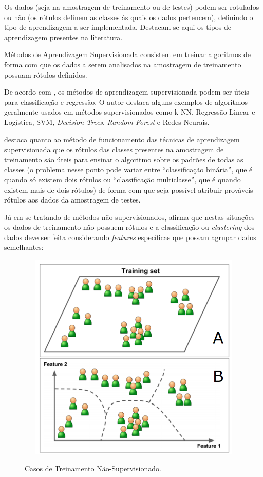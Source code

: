 Os dados (seja na amostragem de treinamento ou de testes) podem ser rotulados ou não (os rótulos definem as classes às quais os dados pertencem), definindo o tipo de aprendizagem a ser implementada. Destacam-se aqui os tipos de aprendizagem presentes na literatura.






Métodos de Aprendizagem Supervisionada consistem em treinar algoritmos de forma com que os dados a serem analisados na amostragem de treinamento possuam rótulos definidos. 

De acordo com , os métodos de aprendizagem supervisionada podem ser úteis para classificação e regressão. O autor destaca alguns exemplos de algoritmos geralmente usados em métodos supervisionados como k-NN, Regressão Linear e Logística, SVM, \textit{Decision Trees},  \textit{Random Forest} e Redes Neurais.

 destaca quanto ao método de funcionamento das técnicas de aprendizagem supervisionada que os rótulos das classes presentes na amostragem de treinamento são úteis para ensinar o algoritmo sobre os padrões de todas as classes (o problema nesse ponto pode variar entre ``classificação binária'', que é quando só existem dois rótulos ou ``classificação multiclasse'', que é quando existem mais de dois rótulos) de forma com que seja possível atribuir prováveis rótulos aos dados da amostragem de testes.


Já em se tratando de métodos não-supervisionados,  afirma que nestas situações os dados de treinamento não possuem rótulos e a classificação ou \textit{clustering} dos dados deve ser feita considerando \textit{features} específicas que possam agrupar dados semelhantes:



\begin{figure}[H]
\centering
\caption{Casos de Treinamento Não-Supervisionado.} \includegraphics[width=15cm,height=10cm,keepaspectratio]{figs/unsuper.png}
\newline {}\label{fig:unsuper}
\end{figure}

